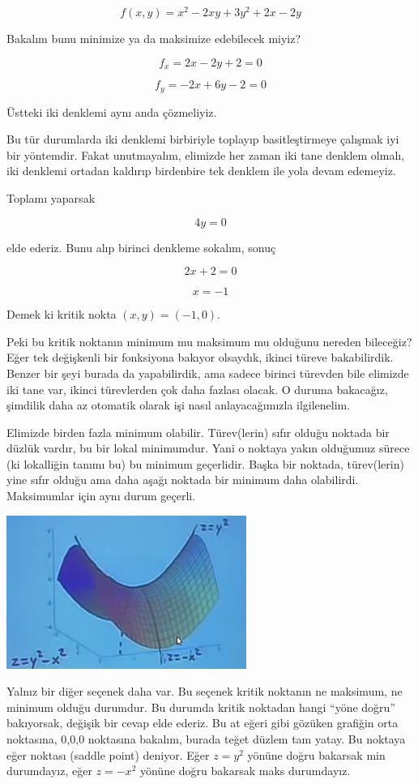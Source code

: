 \documentclass[12pt,fleqn]{article}\usepackage{../../common}
\begin{document}
$$ f(x,y) = x^2 - 2xy + 3y^2 + 2x - 2y $$

Bakalım bunu minimize ya da maksimize edebilecek miyiz? 

$$ f_x = 2x - 2y + 2 = 0$$

$$ f_y = -2x + 6y - 2 = 0 $$

Üstteki iki denklemi aynı anda çözmeliyiz. 

Bu tür durumlarda iki denklemi birbiriyle toplayıp basitleştirmeye çalışmak iyi
bir yöntemdir. Fakat unutmayalım, elimizde her zaman iki tane denklem olmalı,
iki denklemi ortadan kaldırıp birdenbire tek denklem ile yola devam edemeyiz.

Toplamı yaparsak

$$ 4y = 0 $$

elde ederiz. Bunu alıp birinci denkleme sokalım, sonuç

$$ 2x + 2 = 0 $$

$$ x = -1 $$

Demek ki kritik nokta $(x,y) = (-1,0)$. 

Peki bu kritik noktanın minimum mu maksimum mu olduğunu nereden bileceğiz?  Eğer
tek değişkenli bir fonksiyona bakıyor olsaydık, ikinci türeve
bakabilirdik. Benzer bir şeyi burada da yapabilirdik, ama sadece birinci
türevden bile elimizde iki tane var, ikinci türevlerden çok daha fazlası
olacak. O duruma bakacağız, şimdilik daha az otomatik olarak işi nasıl
anlayacağımızla ilgilenelim.


Elimizde birden fazla minimum olabilir. Türev(lerin) sıfır olduğu noktada
bir düzlük vardır, bu bir lokal minimumdur. Yani o noktaya yakın olduğumuz
sürece (ki lokalliğin tanımı bu) bu minimum geçerlidir. Başka bir noktada,
türev(lerin) yine sıfır olduğu ama daha aşağı noktada bir minimum daha
olabilirdi. Maksimumlar için aynı durum geçerli.

\begin{center}
\includegraphics[height=5cm]{9_4.png}
\end{center}

Yalnız bir diğer seçenek daha var. Bu seçenek kritik noktanın ne maksimum,
ne minimum olduğu durumdur. Bu durumda kritik noktadan hangi ``yöne doğru''
bakıyorsak, değişik bir cevap elde ederiz. Bu at eğeri gibi gözüken
grafiğin orta noktasına, 0,0,0 noktasına bakalım, burada teğet düzlem tam
yatay. Bu noktaya eğer noktası (saddle point) deniyor. Eğer $z=y^2$ yönüne
doğru bakarsak min durumdayız, eğer $z=-x^2$ yönüne doğru bakarsak maks
durumdayız.
\end{document}

